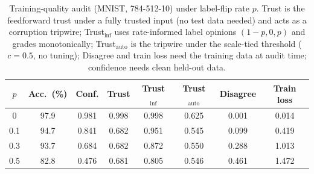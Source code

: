 \begin{table}[ht]
\centering
\begin{tabular}{cccccccc}
\hline
$p$ & Acc.\ (\%) & Conf. & Trust & Trust$_{\mathrm{inf}}$ & Trust$_{\mathrm{auto}}$ & Disagree & Train loss \\
\hline
0   & 97.9 & 0.981 & 0.998 & 0.998 & 0.625 & 0.001 & 0.014 \\
0.1 & 94.7 & 0.841 & 0.682 & 0.951 & 0.545 & 0.099 & 0.419 \\
0.3 & 93.7 & 0.684 & 0.682 & 0.872 & 0.550 & 0.288 & 1.013 \\
0.5 & 82.8 & 0.476 & 0.681 & 0.805 & 0.546 & 0.461 & 1.472 \\
\hline
\end{tabular}
\caption{Training-quality audit (MNIST, 784-512-10) under label-flip rate $p$. Trust is the feedforward trust under a fully trusted input (no test data needed) and acts as a corruption tripwire; Trust$_{\mathrm{inf}}$ uses rate-informed label opinions $(1{-}p, 0, p)$ and grades monotonically; Trust$_{\mathrm{auto}}$ is the tripwire under the scale-tied threshold ($c = 0.5$, no tuning); Disagree and train loss need the training data at audit time; confidence needs clean held-out data.}
\label{tab:diss-audit}
\end{table}

